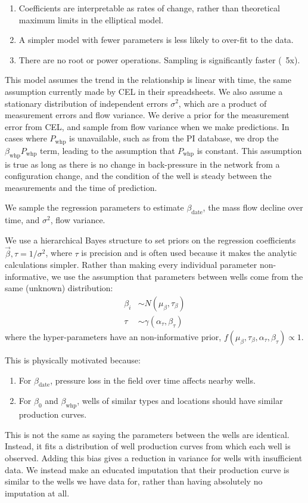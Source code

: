\documentclass[a4paper, 12pt]{article}
\newlength{\drop}
\begin{document}
\begin{enumerate}
\item Coefficients are interpretable as rates of change, rather than theoretical maximum limits in the elliptical model.
\item A simpler model with fewer parameters is less likely to over-fit to the data.
\item There are no root or power operations. Sampling is significantly faster (~5x).
\end{enumerate}

This model assumes the trend in the relationship is linear with time, the same assumption currently made by CEL in their spreadsheets. We also assume a stationary distribution of independent errors $\sigma^2$, which are a product of measurement errors and flow variance. We derive a prior for the measurement error from CEL, and sample from flow variance when we make predictions. In cases where $P_\text{whp}$ is unavailable, such as from the PI database, we drop the $\beta_\text{whp}P_\text{whp}$ term, leading to the assumption that $P_\text{whp}$ is constant. This assumption is true as long as there is no change in back-pressure in the network from a configuration change, and the condition of the well is steady between the measurements and the time of prediction.

We sample the regression parameters to estimate $\beta_\text{date}$, the mass flow decline over time, and $\sigma^2$, flow variance.

We use a hierarchical Bayes structure to set priors on the regression coefficients $\vec{\beta},\tau=1/\sigma^2$, where $\tau$ is precision and is often used because it makes the analytic calculations simpler. Rather than making every individual parameter non-informative, we use the assumption that parameters between wells come from the same (unknown) distribution:
\begin{align}
\beta_i &\sim N\left( \mu_\beta,\tau_\beta \right)\\
\tau &\sim \gamma\left(\alpha_\tau,\beta_\tau\right)
\end{align}
where the hyper-parameters have an non-informative prior, $f\left(\mu_\beta,\tau_\beta,\alpha_\tau,\beta_\tau\right) \propto 1$.
 
This is physically motivated because:
\begin{enumerate}
\item For $\beta_\text{date}$, pressure loss in the field over time affects nearby wells.
\item For $\beta_0$ and $\beta_\text{whp}$, wells of similar types and locations should have similar production curves.
\end{enumerate}
This is not the same as saying the parameters between the wells are identical. Instead, it fits a distribution of well production curves from which each well is observed. Adding this bias gives a reduction in variance for wells with insufficient data. We instead make an educated imputation that their production curve is similar to the wells we have data for, rather than having absolutely no imputation at all.
\end{document}
